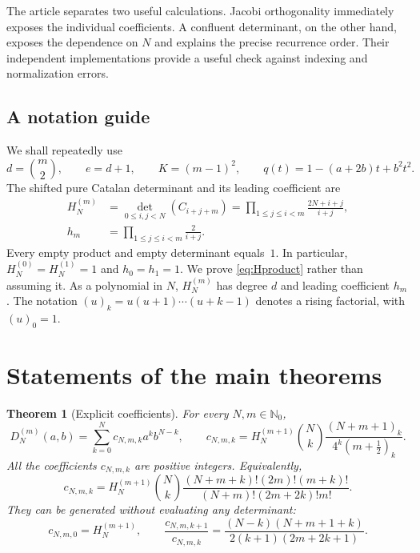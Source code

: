 \documentclass[11pt,a4paper]{article}
\numberwithin{equation}{section}
\newtheorem{theorem}{Theorem}[section]
\theoremstyle{definition}
\theoremstyle{remark}
\newcommand{\NN}{\mathbb N_0}
\newcommand{\D}[2]{D_{#1}^{(#2)}}
\newcommand{\HH}[2]{H_{#1}^{(#2)}}
\begin{document}
The article separates two useful calculations.  Jacobi orthogonality
immediately exposes the individual coefficients.  A confluent determinant,
on the other hand, exposes the dependence on $N$ and explains the precise
recurrence order.  Their independent implementations provide a useful
check against indexing and normalization errors.

\subsection{A notation guide}
We shall repeatedly use
\begin{equation}\label{eq:notation}
 d=\binom m2,\qquad e=d+1,\qquad K=(m-1)^2,\qquad
 q(t)=1-(a+2b)t+b^2t^2.
\end{equation}
The shifted pure Catalan determinant and its leading coefficient are
\begin{align}
 \HH{N}{m}&=\det_{0\leq i,j<N}(C_{i+j+m})
 =\prod_{1\leq j\leq i<m}\frac{2N+i+j}{i+j},\label{eq:Hproduct}\\
 h_m&=\prod_{1\leq j\leq i<m}\frac{2}{i+j}.
 \label{eq:h}
\end{align}
Every empty product and empty determinant equals~$1$.  In particular,
$H_N^{(0)}=H_N^{(1)}=1$ and $h_0=h_1=1$.  We prove
\eqref{eq:Hproduct} rather than assuming it.  As a polynomial in $N$,
$H_N^{(m)}$ has degree $d$ and leading coefficient $h_m$.
The notation $(u)_k=u(u+1)\cdots(u+k-1)$ denotes a rising factorial,
with $(u)_0=1$.

\section{Statements of the main theorems}\label{sec:main}

\begin{theorem}[Explicit coefficients]\label{thm:coeff}
For every $N,m\in\NN$,
\begin{equation}\label{eq:coeff}
 \D{N}{m}(a,b)=\sum_{k=0}^N c_{N,m,k}a^k b^{N-k},\qquad
 c_{N,m,k}=\HH{N}{m+1}\binom Nk
       \frac{(N+m+1)_k}{4^k(m+\tfrac12)_k}.
\end{equation}
All the coefficients $c_{N,m,k}$ are positive integers.  Equivalently,
\begin{equation}\label{eq:coeff-factorial}
 c_{N,m,k}=\HH{N}{m+1}\binom Nk
 \frac{(N+m+k)!(2m)!(m+k)!}
 {(N+m)!(2m+2k)!m!}.
\end{equation}
They can be generated without evaluating any determinant:
\begin{equation}\label{eq:coeff-update}
 c_{N,m,0}=\HH{N}{m+1},\qquad
 \frac{c_{N,m,k+1}}{c_{N,m,k}}=
 \frac{(N-k)(N+m+1+k)}{2(k+1)(2m+2k+1)}.
\end{equation}
\end{theorem}
\end{document}
